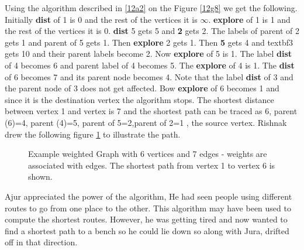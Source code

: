 Using the algorithm described in \ref{12a2} on the Figure \ref{12g8} we get the following.
Initially \textbf{dist} of 1 is 0 and the rest of the vertices it is $\infty$. \textbf{explore} of 1 is 1 and the rest of the vertices it is 0. \textbf{dist} 5 gets 5 and \textbf{2} gets 2. The labels of parent of 2 gets 1 and parent of 5 gets 1. Then \textbf{explore} 2 gets 1. Then \textbf{5} gets 4 and textbf{3} gets 10 and their parent labels become 2. Now \textbf{explore} of 5 is 1. The label \textbf{dist} of 4 becomes 6 and parent label of 4 becomes 5. The \textbf{explore} of 4 is 1. The \textbf{dist} of 6 becomes 7 and its parent node becomes 4. Note that the label \textbf{dist} of 3 and the parent node of 3 does not get affected. Bow \textbf{explore} of 6 becomes 1 and since it is the destination vertex the algorithm stops. The shortest distance between vertex 1 and vertex is 7 and the shortest path can be traced as 6, parent (6)=4, parent (4)=5, parent of 5=2,parent of 2=1 , the source vertex.
Rishnak drew the following figure \ref{12g9} to illustrate the path.

\begin{figure}
\begin{center}
\caption{ Example weighted Graph with 6 vertices and 7 edges - weights are associated with edges. The shortest path from vertex 1 to vertex 6 is shown.}\label{12g9}
\end{center}
\end{figure}

Ajur appreciated the power of the algorithm, He had seen people using different routes to go from one place to the other. This algorithm may have been used to compute the shortest routes. However, he was getting tired and now wanted to find a shortest path to a bench so he could lie down so along with Jura, drifted off in that direction.